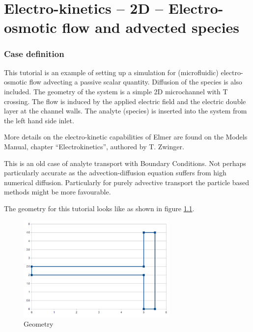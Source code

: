 \chapter{Electro-kinetics -- 2D -- Electro-osmotic flow and advected species}


\subsection*{Case definition}

This tutorial is an example of setting up a simulation for (microfluidic) electro-osmotic flow advecting a passive scalar quantity. Diffusion of the species is also included. The geometry of the system is a simple 2D microchannel with T crossing. The flow is induced by the applied electric field and the electric double layer at the channel walls. The analyte (species) is inserted into the system from the left hand side inlet.

More details on the electro-kinetic capabilities of Elmer are found on the Models Manual, chapter ``Electrokinetics'', authored by T. Zwinger.

This is an old case of analyte transport with  Boundary Conditions.  Not perhaps particularly accurate as the advection-diffusion equation suffers  from high numerical diffusion. Particularly for purely advective transport  the particle based methods might be more favourable. 

The geometry for this tutorial looks like as shown in figure \ref{fg:geometry}.

\begin{figure}[H]
\centering
\includegraphics[width=0.7\textwidth]{geometry.png}
\caption{Geometry}\label{fg:geometry}
\end{figure}  

